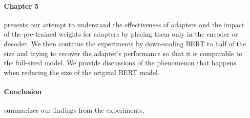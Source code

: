 \paragraph{Chapter 5} presents our attempt to understand the effectiveness of adapters and the impact of the pre-trained weights for adapters by placing them only in the encoder or decoder. We then continue the experiments by down-scaling BERT to half of the size and trying to recover the adapter's performance so that it is comparable to the full-sized model. We provide discussions of the phenomenon that happens when reducing the size of the original BERT model.

\paragraph{Conclusion} summarizes our findings from the experiments.